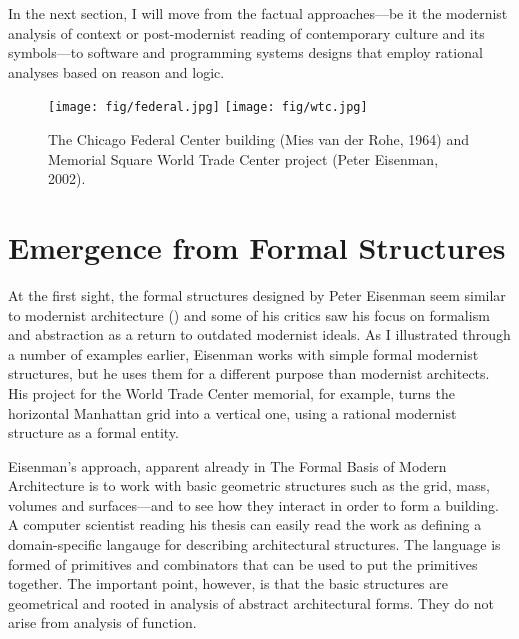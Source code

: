 In the next section, I will move from the factual approaches---be it the modernist analysis
of context or post-modernist reading of contemporary culture and its symbols---to software and
programming systems designs that employ rational analyses based on reason and logic.

\begin{figure}
\centering
\texttt{[image: fig/federal.jpg]}\quad
\texttt{[image: fig/wtc.jpg]}
\caption{The Chicago Federal Center building (Mies van der Rohe, 1964) and Memorial Square World Trade
Center project (Peter Eisenman, 2002).}
\label{fig:wtc}
\end{figure}

\section{Emergence from Formal Structures}
At the first sight, the formal structures designed by Peter Eisenman seem similar to modernist
architecture () and some of his critics saw his focus on formalism and
abstraction as a return to outdated modernist ideals. As I illustrated through a number of examples
earlier, Eisenman works with simple formal modernist structures, but he uses them for a different
purpose than modernist architects. His project for the World Trade Center memorial, for
example, turns the horizontal Manhattan grid into a vertical one, using a rational modernist
structure as a formal entity.

Eisenman's approach, apparent already in The Formal Basis of Modern Architecture is to work
with basic geometric structures such as the grid, mass, volumes and surfaces---and to see how
they interact in order to form a building. A computer scientist reading his thesis can easily
read the work as defining a domain-specific langauge for describing architectural structures.
The language is formed of primitives and combinators that can be used to put the primitives
together. The important point, however, is that the basic structures are geometrical and rooted
in analysis of abstract architectural forms. They do not arise from analysis of function.


